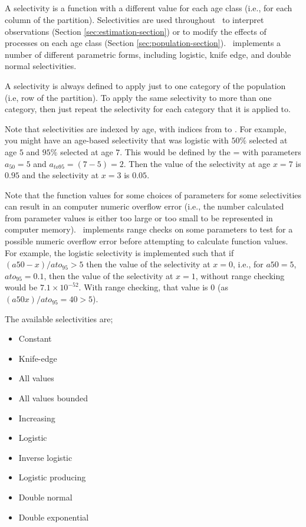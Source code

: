 \subsection{\label{sec:selectivities}}

A selectivity is a function with a different value for each age class (i.e., for each column of the partition). Selectivities are used throughout \SPM\ to interpret observations (Section \ref{sec:estimation-section}) or to modify the effects of processes on each age class (Section \ref{sec:population-section}). \SPM\ implements a number of different parametric forms, including logistic, knife edge, and double normal selectivities.

A selectivity is always defined to apply just to one category of the population (i.e, row of the partition). To apply the same selectivity to more than one category, then just repeat the selectivity for each category that it is applied to.

Note that selectivities are indexed by age, with indices from  to . For example, you might have an age-based selectivity that was logistic with $50\%$ selected at age $5$ and $95\%$ selected at age $7$. This would be defined by the = with parameters $a_{50}=5$ and $a_{to95}=(7-5)=2$. Then the value of the selectivity at age $x=7$ is $0.95$ and the selectivity at $x=3$ is $0.05$.

Note that the function values for some choices of parameters for some selectivities can result in an computer numeric overflow error (i.e., the number calculated from parameter values is either too large or too small to be represented in computer memory). \SPM\ implements range checks on some parameters to test for a possible numeric overflow error before attempting to calculate function values. For example, the logistic selectivity is implemented such that if $(a50-x)/ato_95 > 5$ then the value of the selectivity at $x=0$, i.e., for $a50=5$, $ato_95=0.1$, then the value of the selectivity at $x=1$, without range checking would be $7.1 \times 10^{-52}$. With range checking, that value is $0$ (as $(a50 x)/ato_95=40 > 5$).

The available selectivities are;

\begin{itemize}
  \item Constant
  \item Knife-edge
  \item All values
  \item All values bounded
  \item Increasing
  \item Logistic
	\item Inverse logistic
  \item Logistic producing
  \item Double normal
  \item Double exponential
\end{itemize}

